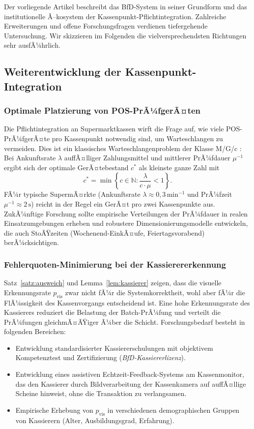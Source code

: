 ﻿\documentclass[a4paper,12pt]{article}
\theoremstyle{definition}
\begin{document}
Der vorliegende Artikel beschreibt das BfD-System in seiner Grundform
und das institutionelle Ã–kosystem der Kassenpunkt-Pflichtintegration.
Zahlreiche Erweiterungen und offene Forschungsfragen verdienen tiefergehende
Untersuchung.  Wir skizzieren im Folgenden die vielversprechendsten Richtungen
sehr ausfÃ¼hrlich.

\subsection{Weiterentwicklung der Kassenpunkt-Integration}

\subsubsection{Optimale Platzierung von POS-PrÃ¼fgerÃ¤ten}

Die Pflichtintegration an Supermarktkassen wirft die Frage auf,
wie viele POS-PrÃ¼fgerÃ¤te pro Kassenpunkt notwendig sind, um
Warteschlangen zu vermeiden.  Dies ist ein klassisches Warteschlangenproblem
der Klasse M/G/c \cite{kleinrock1975}: Bei Ankunftsrate $\lambda$ auffÃ¤lliger
Zahlungsmittel und mittlerer PrÃ¼fdauer $\mu^{-1}$ ergibt sich der optimale
GerÃ¤tebestand $c^*$ als kleinste ganze Zahl mit
\[
c^* = \min \left\{ c \in \mathbb{N} : \frac{\lambda}{c \cdot \mu} < 1 \right\}.
\]
FÃ¼r typische SupermÃ¤rkte (Ankunftsrate $\lambda \approx 0{,}3\,\text{min}^{-1}$
und PrÃ¼fzeit $\mu^{-1} \approx 2\,\text{s}$) reicht in der Regel ein GerÃ¤t pro
zwei Kassenpunkte aus.  ZukÃ¼nftige Forschung sollte empirische Verteilungen
der PrÃ¼fdauer in realen Einsatzumgebungen erheben und robustere
Dimensionierungsmodelle entwickeln, die auch StoÃŸzeiten (Wochenend-EinkÃ¤ufe,
Feiertagsvorabend) berÃ¼cksichtigen.

\subsubsection{Fehlerquoten-Minimierung bei der Kassierererkennung}

Satz~\ref{satz:ausweich} und Lemma~\ref{lem:kassierer} zeigen,
dass die visuelle Erkennungsrate $p_{\text{vis}}$ zwar nicht fÃ¼r die
Systemkorrektheit, wohl aber fÃ¼r die FlÃ¼ssigkeit des Kassenvorgangs entscheidend ist.
Eine hohe Erkennungsrate des Kassierers reduziert die Belastung der Batch-PrÃ¼fung
und verteilt die PrÃ¼fungen gleichmÃ¤ÃŸiger Ã¼ber die Schicht.
Forschungsbedarf besteht in folgenden Bereichen:
\begin{itemize}
  \item Entwicklung standardisierter Kassiererschulungen mit objektivem
        Kompetenztest und Zertifizierung (\emph{BfD-Kassiererlizenz}).
  \item Entwicklung eines assistiven Echtzeit-Feedback-Systems am Kassenmonitor,
        das den Kassierer durch Bildverarbeitung der Kassenkamera auf
        auffÃ¤llige Scheine hinweist, ohne die Transaktion zu verlangsamen.
  \item Empirische Erhebung von $p_{\text{vis}}$ in verschiedenen demographischen
        Gruppen von Kassierern (Alter, Ausbildungsgrad, Erfahrung).
\end{itemize}
\end{document}
